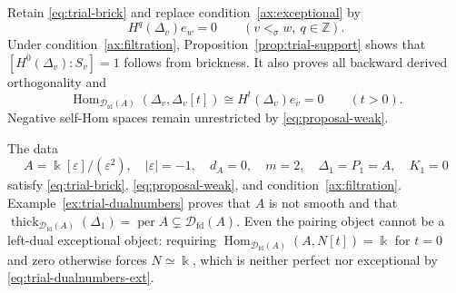 \documentclass[11pt,a4paper]{article}
\newcommand{\D}{\mathcal D}
\newcommand{\ZZ}{\mathbb{Z}}
\newcommand{\std}{\Delta}
\DeclareMathOperator{\fd}{fd}
\DeclareMathOperator{\Hom}{Hom}
\DeclareMathOperator{\per}{per}
\theoremstyle{plain}
\theoremstyle{definition}
\numberwithin{equation}{section}
\begin{document}
Retain \eqref{eq:trial-brick} and replace
condition~\ref{ax:exceptional} by
\begin{equation*}\tag{C'}\label{eq:proposal-weak}
 H^q(\std_v)e_w=0\qquad(v<_\sigma w,\ q\in\ZZ).
\end{equation*}
Under condition~\ref{ax:filtration},
Proposition~\ref{prop:trial-support} shows that
$[H^0(\std_v):S_v]=1$ follows from brickness. It also proves all
backward derived orthogonality and
\begin{equation}\label{eq:trial-weak-self}
 \Hom_{\D_{\fd}(A)}(\std_v,\std_v[t])
 \cong H^t(\std_v)e_v=0\qquad(t>0).
\end{equation}
Negative self-Hom spaces remain unrestricted by
\eqref{eq:proposal-weak}.

The data
\[
 A=\Bbbk[\varepsilon]/(\varepsilon^2),\quad
 |\varepsilon|=-1,\quad d_A=0,\quad
 m=2,\quad\std_1=P_1=A,\quad K_1=0
\]
satisfy \eqref{eq:trial-brick}, \eqref{eq:proposal-weak}, and
condition~\ref{ax:filtration}. Example~\ref{ex:trial-dualnumbers}
proves that $A$ is not smooth and that
$\operatorname{thick}_{\D_{\fd}(A)}(\std_1)=\per A
\subsetneq\D_{\fd}(A)$.
Even the pairing object cannot be a left-dual exceptional object:
requiring
$\Hom_{\D_{\fd}(A)}(A,N[t])=\Bbbk$ for $t=0$ and zero otherwise
forces $N\simeq\Bbbk$, which is neither perfect nor exceptional by
\eqref{eq:trial-dualnumbers-ext}.
\end{document}
